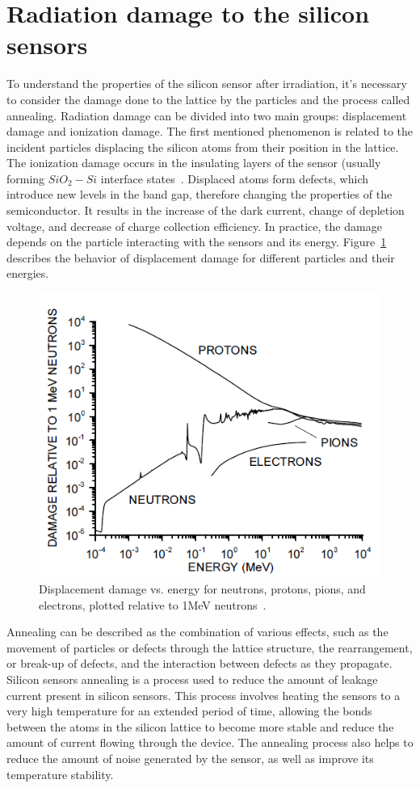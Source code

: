 \section{Radiation damage to the silicon sensors}
\label{silicon_damage}
To understand the properties of the silicon sensor after irradiation, it's necessary to consider the damage done to the lattice by the particles and the process called annealing. Radiation damage can be divided into two main groups: displacement damage and ionization damage. The first mentioned phenomenon is related to the incident particles displacing the silicon atoms from their position in the lattice. The ionization damage occurs in the insulating layers of the sensor (usually forming $SiO_{2}-Si$ interface states~\cite{Moll:1999kv}. Displaced atoms form defects, which introduce new levels in the band gap, therefore changing the properties of the semiconductor. It results in the increase of the dark current, change of depletion voltage, and decrease of charge collection efficiency. In practice, the damage depends on the particle interacting with the sensors and its energy. Figure~\ref{fig_niel_si} describes the behavior of displacement damage for different particles and their energies.  
\begin{figure}[!h]
\centering
\includegraphics[width=0.7\columnwidth]{Chapter2/images/displacement_damage.png}
\caption{Displacement damage vs. energy for neutrons, protons, pions, and electrons,
plotted relative to 1MeV neutrons~\cite{Spieler}.}
\label{fig_niel_si}
\end{figure}

Annealing can be described as the combination of various effects, such as the movement of particles or defects through the lattice structure, the rearrangement, or break-up of defects, and the interaction between defects as they propagate. Silicon sensors annealing is a process used to reduce the amount of leakage current present in silicon sensors. This process involves heating the sensors to a very high temperature for an extended period of time, allowing the bonds between the atoms in the silicon lattice to become more stable and reduce the amount of current flowing through the device. The annealing process also helps to reduce the amount of noise generated by the sensor, as well as improve its temperature stability. \bigbreak

